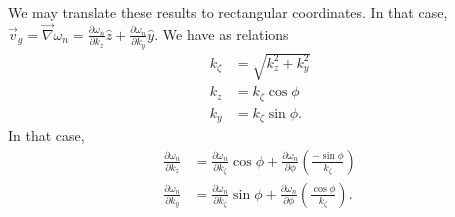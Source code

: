 \documentclass{article}
\begin{document}
We may translate these results to rectangular coordinates. In that case, $\vec{v}_{g} = \vec{\nabla} \omega_{n} = \frac{\partial \omega_{n}}{\partial k_{z}} \hat{z} + \frac{\partial \omega_{n}}{\partial k_{y}} \hat{y}$. We have as relations
\begin{align}
k_{\zeta} &= \sqrt{k_{z}^2 + k_{y}^2} \\
k_{z} &= k_{\zeta} \cos{\phi} \\
k_{y} &= k_{\zeta} \sin{\phi}.
\end{align}
In that case,
\begin{align}
\frac{\partial \omega_{n}}{\partial k_{z}} &= \frac{\partial \omega_{n}}{\partial k_{\zeta}} \cos{\phi} + \frac{\partial \omega_{n}}{\partial \phi} \left(\frac{-\sin{\phi}}{k_{\zeta}}\right) \\
\frac{\partial \omega_{n}}{\partial k_{y}} &= \frac{\partial \omega_{n}}{\partial k_{\zeta}} \sin{\phi} + \frac{\partial \omega_{n}}{\partial \phi} \left(\frac{\cos{\phi}}{k_{\zeta}}\right).
\end{align}
\end{document}
